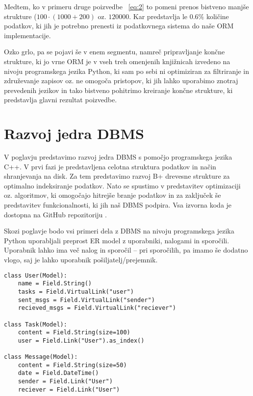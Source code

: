 \documentclass[a4paper,12pt,openright]{book}
\begin{document}
    Medtem, ko v primeru druge poizvedbe ~\eqref{eq:2} to pomeni prenos bistveno manjše strukture ($100 \cdot (1000 + 200)$ oz. $\num{120000}$. Kar predstavlja le $0.6\%$ količine podatkov, ki jih je potrebno prenesti iz podatkovnega sistema do naše ORM implementacije.

    Ozko grlo, pa se pojavi še v enem segmentu, namreč pripravljanje končne strukture, ki jo vrne ORM je v vseh treh omenjenih knjižnicah izvedeno na nivoju programskega jezika Python, ki sam po sebi ni optimiziran za filtriranje in združevanje zapisov oz. ne omogoča pristopov, ki jih lahko uporabimo znotraj prevedenih jezikov in tako bistveno pohitrimo kreiranje končne strukture, ki predstavlja glavni rezultat poizvedbe.

\chapter{Razvoj jedra DBMS}
\label{ch0}
    V poglavju predstavimo razvoj jedra DBMS s pomočjo programskega jezika C++. V prvi fazi je predstavljena celotna struktura podatkov in način shranjevanja na disk. Za tem predstavimo razvoj B+ drevesne strukture za optimalno indeksiranje podatkov. Nato se spustimo v predstavitev optimizaciji oz. algoritmov, ki omogočajo hitrejše branje podatkov in za zaključek še predstavitev funkcionalnosti, ki jih naš DBMS podpira.
    \newline
    \newline
    \noindent
    Vsa izvorna koda je dostopna na GitHub repozitoriju \cite{GRAPHENIX_GITHUB}.

    \newpage
    \noindent
    Skozi poglavje bodo vsi primeri dela z DBMS na nivoju programskega jezika Python uporabljali preprost ER model z uporabniki, nalogami in sporočili. Uporabnik lahko ima več nalog in sporočil – pri sporočilih, pa imamo še dodatno vlogo, saj je lahko uporabnik pošiljatelj/prejemnik.
\begin{verbatim}
class User(Model):
    name = Field.String()
    tasks = Field.VirtualLink("user")
    sent_msgs = Field.VirtualLink("sender")
    recieved_msgs = Field.VirtualLink("reciever")

class Task(Model):
    content = Field.String(size=100)
    user = Field.Link("User").as_index()

class Message(Model):
    content = Field.String(size=50)
    date = Field.DateTime()
    sender = Field.Link("User")
    reciever = Field.Link("User")
\end{verbatim}
    
\end{document}
